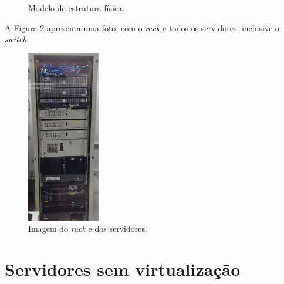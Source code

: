 \begin{figure}[h!]
 \centering
 \caption{Modelo de estrutura física.}
 \label{fig:servfisicos}
\end{figure}

A Figura \ref{fig:servrack} apresenta uma foto, com o \textit{rack} e todos os servidores, inclusive o \textit{switch}.

\begin{figure}[h!]
 \centering
 \includegraphics[width=120px]{img/servrack.eps}
 \caption{Imagem do \textit{rack} e dos servidores.}
 \label{fig:servrack}
\end{figure}

\section{Servidores sem virtualização}
\label{section:servsemvirt}

